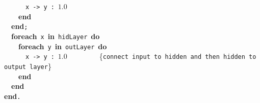 ~~~~~~\verb&x&~\verb&->&~\verb&y&~\verb&:&~$1.0$~~~~\\
~~~~{\bf end}\\
~~{\bf end}\verb&;&\\
~~{\bf foreach}~\verb&x&~{\bf in}~\verb&hidLayer&~{\bf do}\\
~~~~{\bf foreach}~\verb&y&~{\bf in}~\verb&outLayer&~{\bf do}\\
~~~~~~\verb&x&~\verb&->&~\verb&y&~\verb&:&~$1.0$~~~~~~~~~{\small \{\verb{connect input to hidden and then hidden to output layer{\}}\\
~~~~{\bf end}\\
~~{\bf end}\\
{\bf end}\verb&.&\\
